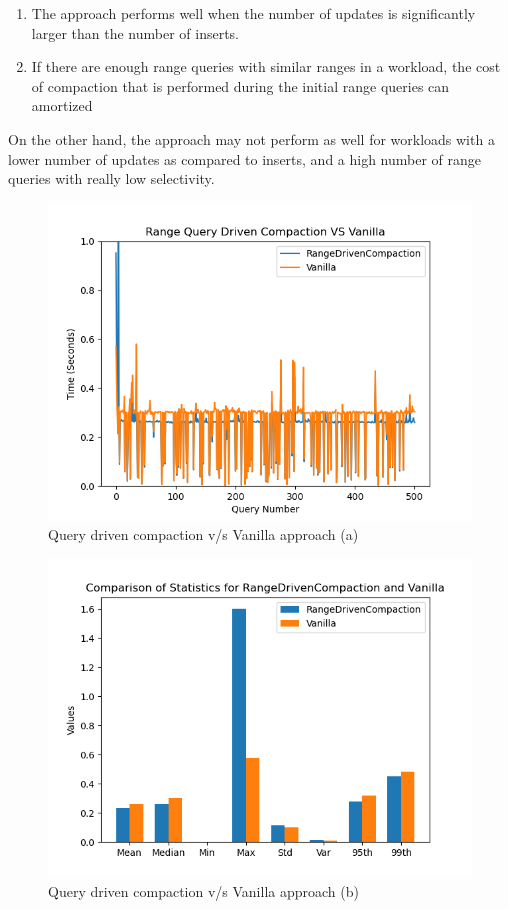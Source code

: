 \documentclass[balance=false, sigconf]{acmart}
\begin{document}
\begin{enumerate}
\item The approach performs well when the number of updates is significantly larger than the number of inserts.
\item If there are enough range queries with similar ranges in a workload, the cost of compaction that is performed during the initial range queries can amortized
\end{enumerate}

On the other hand, the approach may not perform as well for workloads with a lower number of updates as compared to inserts, and a high number of range queries with really low selectivity.

\begin{figure}
  \centering
  \includegraphics[scale = 0.5]{Figures/c_graph.png}
  \caption{Query driven compaction v/s Vanilla approach (a)}
  \label{fig:Fig-1}
\end{figure}

\begin{figure}
  \centering
  \includegraphics[scale = 0.5]{Figures/bgraph.png}
  \caption{Query driven compaction v/s Vanilla approach (b)}
  \label{fig:bargraph}
\end{figure}
\end{document}
